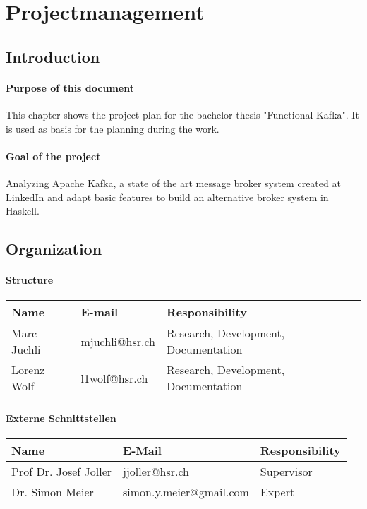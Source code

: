 \chapter{Projectmanagement}

\section*{Introduction}

\subsubsection*{Purpose of this document}
This chapter shows the project plan for the bachelor thesis "Functional Kafka".
It is used as basis for the planning during the work. 

\subsubsection*{Goal of the project}
Analyzing Apache Kafka, a state of the art message broker system created at
LinkedIn and adapt basic features to build an alternative broker system in
Haskell. 

\section*{Organization}

\subsubsection*{Structure}

\begin{tabular}[t]{|l|l|l|} \hline
\textbf{Name} & \textbf{E-mail} & \textbf{Responsibility} \\ \hline
Marc Juchli & mjuchli@hsr.ch & Research, Development, Documentation \\ \hline
Lorenz Wolf & l1wolf@hsr.ch & Research, Development, Documentation \\ \hline 
\end{tabular}

\subsubsection*{Externe Schnittstellen}

\begin{tabular}[t]{|l|l|l|} \hline
\textbf{Name} & \textbf{E-Mail} & \textbf{Responsibility}  \\ \hline
Prof Dr. Josef Joller & jjoller@hsr.ch & Supervisor \\ \hline 
Dr. Simon Meier & simon.y.meier@gmail.com & Expert  \\ \hline\end{tabular}


